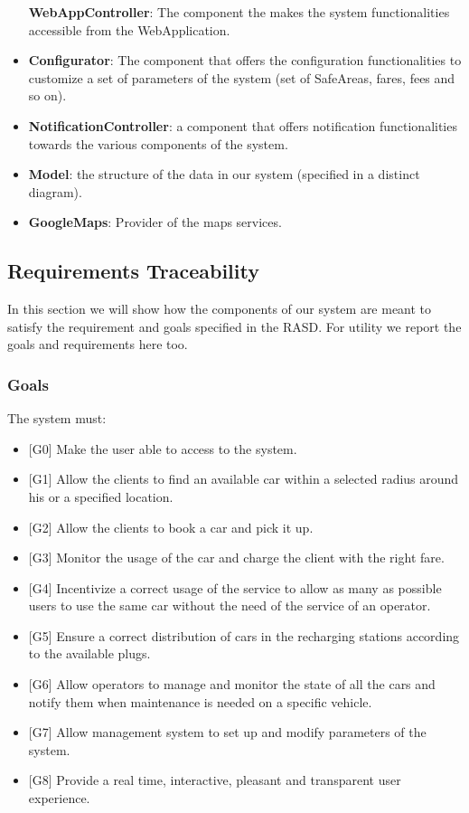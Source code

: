 \documentclass[]{article}
\providecommand{\tightlist}{%
  \setlength{\itemsep}{0pt}\setlength{\parskip}{0pt}}
\begin{document}
\begin{itemize}
  \textbf{WebAppController}: The component the makes the system
  functionalities accessible from the WebApplication.
\item
  \textbf{Configurator}: The component that offers the configuration
  functionalities to customize a set of parameters of the system (set of
  SafeAreas, fares, fees and so on).
\item
  \textbf{NotificationController}: a component that offers notification
  functionalities towards the various components of the system.
\item
  \textbf{Model}: the structure of the data in our system (specified in
  a distinct diagram).
\item
  \textbf{GoogleMaps}: Provider of the maps services.
\end{itemize}

\subsection{Requirements Traceability}\label{requirements-traceability}

In this section we will show how the components of our system are meant
to satisfy the requirement and goals specified in the RASD. For utility
we report the goals and requirements here too.

\subsubsection{Goals}\label{goals}

The system must:

\begin{itemize}
\tightlist
\item
  {[}G0{]} Make the user able to access to the system.
\item
  {[}G1{]} Allow the clients to find an available car within a selected
  radius around his or a specified location.
\item
  {[}G2{]} Allow the clients to book a car and pick it up.
\item
  {[}G3{]} Monitor the usage of the car and charge the client with the
  right fare.
\item
  {[}G4{]} Incentivize a correct usage of the service to allow as many
  as possible users to use the same car without the need of the service
  of an operator.
\item
  {[}G5{]} Ensure a correct distribution of cars in the recharging
  stations according to the available plugs.
\item
  {[}G6{]} Allow operators to manage and monitor the state of all the
  cars and notify them when maintenance is needed on a specific vehicle.
\item
  {[}G7{]} Allow management system to set up and modify parameters of
  the system.
\item
  {[}G8{]} Provide a real time, interactive, pleasant and transparent
  user experience.
\end{itemize}
\end{document}
